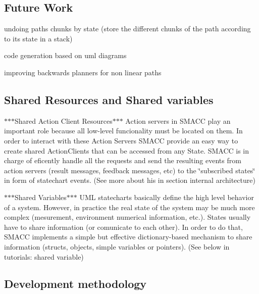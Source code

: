 \subsection*{Future Work}


\begin{DoxyItemize}
\item undoing paths chunks by state (store the different chunks of the path according to its state in a stack)
\item code generation based on uml diagrams
\item improving backwards planners for non linear paths
\end{DoxyItemize}

\subsection*{Shared Resources and Shared variables}


\begin{DoxyItemize}
\item $\ast$$\ast$$\ast$\+Shared Action Client Resources$\ast$$\ast$$\ast$ Action servers in S\+M\+A\+CC play an important role because all low-\/level funcionality must be located on them. In order to interact with these Action Servers S\+M\+A\+CC provide an easy way to create shared Action\+Clients that can be accessed from any State. S\+M\+A\+CC is in charge of eficently handle all the requests and send the resulting events from action servers (result messages, feedback messages, etc) to the \char`\"{}subscribed states\char`\"{} in form of statechart events. (See more about his in section internal architecture)
\item $\ast$$\ast$$\ast$\+Shared Variables$\ast$$\ast$$\ast$ U\+ML statecharts basically define the high level behavior of a system. However, in practice the real state of the system may be much more complex (mesurement, environment numerical information, etc.). States usually have to share information (or comunicate to each other). In order to do that, S\+M\+A\+CC implements a simple but effective dictionary-\/based mechanism to share information (structs, objects, simple variables or pointers). (See below in tutorials\+: shared variable) 
\end{DoxyItemize}

 

\subsection*{Development methodology}

